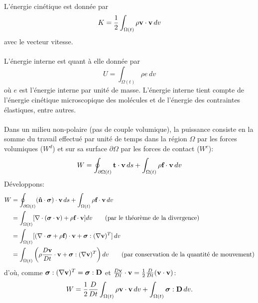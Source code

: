 \paragraph{}
L'énergie cinétique est donnée par $$K=\frac{1}{2}\int_{\Omega (t)}\rho\textbf{v}\cdot\textbf{v}\,dv$$ avec  le vecteur vitesse.
\paragraph{}
L'énergie interne est quant à elle donnée par $$U=\int_{\Omega (t)}\rho e\,dv$$ où $e$ est l'énergie interne par unité de masse. L'énergie interne tient compte de l'énergie cinétique microscopique des molécules et de l'énergie des contraintes élastiques, entre autres.
\paragraph{}
Dans un milieu non-polaire (pas de couple volumique), la puissance consiste en la somme du travail effectué par unité de temps dans la région $\Omega$ par les forces volumiques ($W^d$) et sur sa surface $\partial \Omega$ par les forces de contact ($W^c$):
\begin{equation}\label{eq:travail}W=\oint_{\partial \Omega (t)}\textbf{t}\cdot\textbf{v}\,ds+\int_{\Omega (t)}\rho\textbf{f}\cdot\textbf{v}\,dv\end{equation}
Développons:
$$\begin{aligned}
W&=\oint_{\partial \Omega (t)}(\textbf{\^n}\cdot\boldsymbol{\sigma})\cdot\textbf{v}\,ds+\int_{\Omega (t)}\rho\textbf{f}\cdot\textbf{v}\,dv\\
 &=\int_{\Omega (t)}[\nabla\cdot(\boldsymbol{\sigma}\cdot\textbf{v})+\rho\textbf{f}\cdot\textbf{v}]dv\qquad\text{(par le théorème de la divergence)}\\
 &=\int_{\Omega (t)}[(\nabla\cdot\boldsymbol{\sigma}+\rho\textbf{f})\cdot\textbf{v}+\boldsymbol{\sigma}:(\nabla\textbf{v})^T]\,dv\\
 &=\int_{\Omega (t)}\left(\rho\frac{D\textbf{v}}{Dt}\cdot\textbf{v}+\boldsymbol{\sigma}:(\nabla\textbf{v})^T\right)dv\qquad\text{(par conservation de la quantité de mouvement)}\\
\end{aligned}$$
d'où, comme $\boldsymbol{\sigma}:(\nabla\textbf{v})^T=\boldsymbol{\sigma}:\textbf{D}$ et $\frac{D\textbf{v}}{Dt}\cdot\textbf{v}=\frac{1}{2}\frac{D}{Dt}(\textbf{v}\cdot\textbf{v})$:
\begin{equation}\label{eq:travail2}W=\frac{1}{2}\frac{D}{Dt}\int_{\Omega (t)}\rho\textbf{v}\cdot\textbf{v}\,dv+\int_{\Omega(t)}\boldsymbol{\sigma}:\textbf{D}\,dv.\end{equation}

